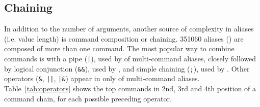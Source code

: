 \subsection{Chaining} 

In addition to the number of arguments, another source of complexity in aliases (i.e. value length) is command composition or chaining.
\num{351060} aliases () are composed of more than one command.
The most popular way to combine commands is with a pipe (\verb!|!), used by  of multi-command aliases, closely followed by logical conjunction (\verb|&&|), used by , and simple chaining (\verb|;|), used by .
Other operators (\verb|&|, \verb!||!, \verb!|&!) appear in only  of multi-command aliases.
Table~\ref{tab:operators} shows the top commands in 2nd, 3rd and 4th position of a command chain, for each possible preceding operator.

